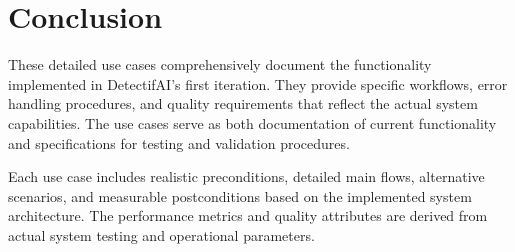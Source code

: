 \documentclass{article}
\begin{document}
\section{Conclusion}

These detailed use cases comprehensively document the functionality implemented in DetectifAI's first iteration. They provide specific workflows, error handling procedures, and quality requirements that reflect the actual system capabilities. The use cases serve as both documentation of current functionality and specifications for testing and validation procedures.

Each use case includes realistic preconditions, detailed main flows, alternative scenarios, and measurable postconditions based on the implemented system architecture. The performance metrics and quality attributes are derived from actual system testing and operational parameters.
\end{document}
